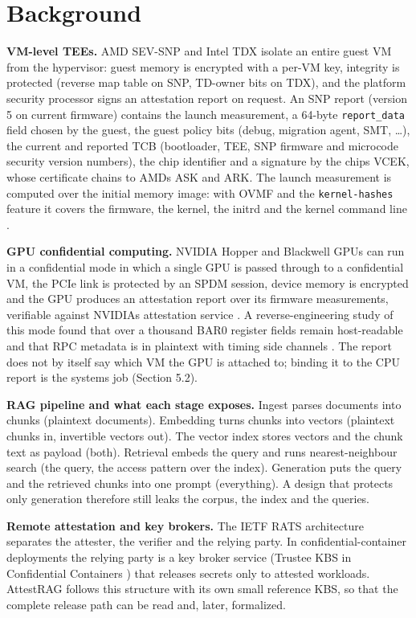 \documentclass[letterpaper,twocolumn,10pt]{article}
\begin{document}
\section{Background}\label{background}

\textbf{VM-level TEEs.} AMD SEV-SNP and Intel TDX isolate an entire guest VM from the hypervisor: guest memory is encrypted with a per-VM key, integrity is protected (reverse map table on SNP, TD-owner bits on TDX), and the platform security processor signs an attestation report on request. An SNP report (version 5 on current firmware) contains the launch measurement, a 64-byte \texttt{report\_data} field chosen by the guest, the guest policy bits (debug, migration agent, SMT, \ldots{}), the current and reported TCB (bootloader, TEE, SNP firmware and microcode security version numbers), the chip identifier and a signature by the chip\textquotesingle s VCEK, whose certificate chains to AMD\textquotesingle s ASK and ARK. The launch measurement is computed over the initial memory image: with OVMF and the \texttt{kernel-hashes} feature it covers the firmware, the kernel, the initrd and the kernel command line \cite{amd2024snpabi}.

\textbf{GPU confidential computing.} NVIDIA Hopper and Blackwell GPUs can run in a confidential mode in which a single GPU is passed through to a confidential VM, the PCIe link is protected by an SPDM session, device memory is encrypted and the GPU produces an attestation report over its firmware measurements, verifiable against NVIDIA\textquotesingle s attestation service \cite{nvidia2024cc}. A reverse-engineering study of this mode found that over a thousand BAR0 register fields remain host-readable and that RPC metadata is in plaintext with timing side channels \cite{gu2025nvidiacc}. The report does not by itself say which VM the GPU is attached to; binding it to the CPU report is the system\textquotesingle s job (Section 5.2).

\textbf{RAG pipeline and what each stage exposes.} Ingest parses documents into chunks (plaintext documents). Embedding turns chunks into vectors (plaintext chunks in, invertible vectors out). The vector index stores vectors and the chunk text as payload (both). Retrieval embeds the query and runs nearest-neighbour search (the query, the access pattern over the index). Generation puts the query and the retrieved chunks into one prompt (everything). A design that protects only generation therefore still leaks the corpus, the index and the queries.

\textbf{Remote attestation and key brokers.} The IETF RATS architecture \cite{rfc9334} separates the attester, the verifier and the relying party. In confidential-container deployments the relying party is a key broker service (Trustee KBS in Confidential Containers \cite{trustee}) that releases secrets only to attested workloads. AttestRAG follows this structure with its own small reference KBS, so that the complete release path can be read and, later, formalized.
\end{document}
